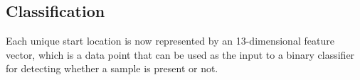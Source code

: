 \documentclass{article}
\begin{document}





\subsection{Classification}
\label{class}
Each unique start location is now represented by an 13-dimensional feature vector, which is a data point that can be used as the input to a binary classifier for detecting whether a sample is present or not.
\end{document}
